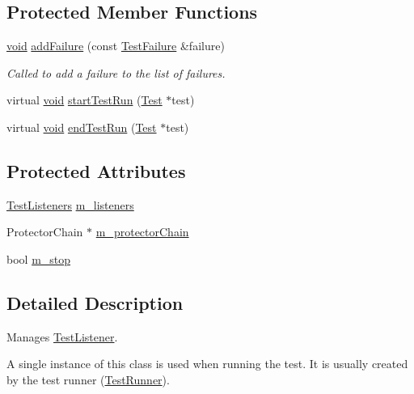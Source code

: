 \subsection*{Protected Member Functions}
\begin{DoxyCompactItemize}
\item 
\hyperlink{wglew_8h_aeea6e3dfae3acf232096f57d2d57f084}{void} \hyperlink{class_test_result_aa423474527cbc89141763ea41336a188}{add\-Failure} (const \hyperlink{class_test_failure}{Test\-Failure} \&failure)
\begin{DoxyCompactList}\small\item\em Called to add a failure to the list of failures. \end{DoxyCompactList}\item 
virtual \hyperlink{wglew_8h_aeea6e3dfae3acf232096f57d2d57f084}{void} \hyperlink{class_test_result_a6263b1ca50fa6bf504332e181bf75670}{start\-Test\-Run} (\hyperlink{class_test}{Test} $\ast$test)
\item 
virtual \hyperlink{wglew_8h_aeea6e3dfae3acf232096f57d2d57f084}{void} \hyperlink{class_test_result_a9721fc94b9991cfd3efde322701ebf70}{end\-Test\-Run} (\hyperlink{class_test}{Test} $\ast$test)
\end{DoxyCompactItemize}
\subsection*{Protected Attributes}
\begin{DoxyCompactItemize}
\item 
\hyperlink{class_test_result_a781741f5636cab07026c43e141781d19}{Test\-Listeners} \hyperlink{class_test_result_a6e5daf8393ca6cdd5a9c3b44074b037b}{m\-\_\-listeners}
\item 
Protector\-Chain $\ast$ \hyperlink{class_test_result_abb4a702b14af262661a9e02a0193312f}{m\-\_\-protector\-Chain}
\item 
bool \hyperlink{class_test_result_ab8c04c2021b19f0c8d19bf4675f2bd86}{m\-\_\-stop}
\end{DoxyCompactItemize}


\subsection{Detailed Description}
Manages \hyperlink{class_test_listener}{Test\-Listener}.

A single instance of this class is used when running the test. It is usually created by the test runner (\hyperlink{class_test_runner}{Test\-Runner}). 

